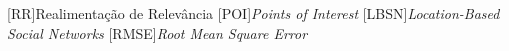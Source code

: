 \begin{acronym}[ACRONYM] 
[RR]{Realimentação de Relevância}
[POI]{\textit{Points of Interest}}
[LBSN]{\textit{Location-Based Social Networks}}
[RMSE]{\textit{Root Mean Square Error}}
\end{acronym}